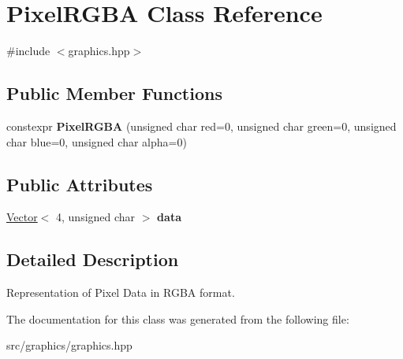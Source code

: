 \hypertarget{class_pixel_r_g_b_a}{}\section{Pixel\+R\+G\+BA Class Reference}
\label{class_pixel_r_g_b_a}


{\ttfamily \#include $<$graphics.\+hpp$>$}

\subsection*{Public Member Functions}
\begin{DoxyCompactItemize}
\item 
\mbox{\label{class_pixel_r_g_b_a_a69b64de852cd399a459b6924e8b3c440}} 
constexpr {\bfseries Pixel\+R\+G\+BA} (unsigned char red=0, unsigned char green=0, unsigned char blue=0, unsigned char alpha=0)
\end{DoxyCompactItemize}
\subsection*{Public Attributes}
\begin{DoxyCompactItemize}
\item 
\mbox{\label{class_pixel_r_g_b_a_af63a7dbd51f6a4a0096626f4111ce62e}} 
\mbox{\hyperlink{class_vector}{Vector}}$<$ 4, unsigned char $>$ {\bfseries data}
\end{DoxyCompactItemize}


\subsection{Detailed Description}
Representation of Pixel Data in R\+G\+BA format. 

The documentation for this class was generated from the following file\+:\begin{DoxyCompactItemize}
\item 
src/graphics/graphics.\+hpp\end{DoxyCompactItemize}
